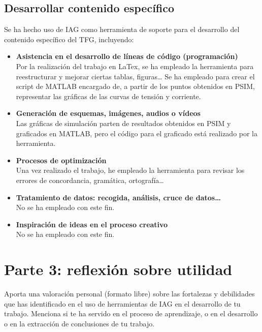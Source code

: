 \documentclass[12pt]{report} %
\begin{document}
\subsection*{Desarrollar contenido específico}
Se ha hecho uso de IAG como herramienta de soporte para el desarrollo del contenido específico del TFG, incluyendo:
\begin{itemize}
    \item \textbf{Asistencia en el desarrollo de líneas de código (programación)} \\
    Por la realización del trabajo en LaTex, se ha empleado la herramienta para reestructurar y mejorar ciertas tablas, figuras\dots{} Se ha empleado para crear el script de MATLAB encargado de, a partir de los puntos obtenidos en PSIM, representar las gráficas de las curvas de tensión y corriente.
    
    \item \textbf{Generación de esquemas, imágenes, audios o vídeos} \\
    Las gráficas de simulación parten de resultados obtenidos en PSIM y graficados en MATLAB, pero el código para el graficado está realizado por la herramienta.
    
    \item \textbf{Procesos de optimización} \\
    Una vez realizado el trabajo, he empleado la herramienta para revisar los errores de concordancia, gramática, ortografía\dots
    
    \item \textbf{Tratamiento de datos: recogida, análisis, cruce de datos\dots} \\
    No se ha empleado con este fin.
    
    \item \textbf{Inspiración de ideas en el proceso creativo} \\
    No se ha empleado con este fin.
\end{itemize}

\section*{Parte 3: reflexión sobre utilidad}

Aporta una valoración personal (formato libre) sobre las fortalezas y debilidades que has identificado en el uso de herramientas de IAG en el desarrollo de tu trabajo. Menciona si te ha servido en el proceso de aprendizaje, o en el desarrollo o en la extracción de conclusiones de tu trabajo.
\end{document}
